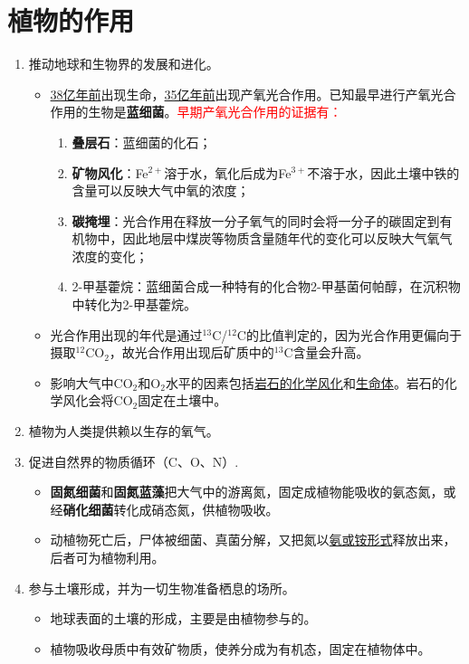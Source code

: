 \section{植物的作用}
\begin{enumerate}
    \item 推动地球和生物界的发展和进化。
    \begin{itemize}
        \item \uline{38亿年前}出现生命，\uline{35亿年前}出现产氧光合作用。已知最早进行产氧光合作用的生物是\textbf{蓝细菌}。\textcolor{red}{早期产氧光合作用的证据有：}
        \begin{enumerate}
            \item \textbf{叠层石}：蓝细菌的化石；
            \item \textbf{矿物风化}：Fe$^{2+}$溶于水，氧化后成为Fe$^{3+}$不溶于水，因此土壤中铁的含量可以反映大气中氧的浓度；
            \item \textbf{碳掩埋}：光合作用在释放一分子氧气的同时会将一分子的碳固定到有机物中，因此地层中煤炭等物质含量随年代的变化可以反映大气氧气浓度的变化；
            \item 2-甲基藿烷：蓝细菌合成一种特有的化合物2-甲基菌何帕醇，在沉积物中转化为2-甲基藿烷。
        \end{enumerate}
        \item 光合作用出现的年代是通过$^{13}$C/$^{12}$C的比值判定的，因为光合作用更偏向于摄取$^{12}$CO$_2$，故光合作用出现后矿质中的$^{13}$C含量会升高。
        \item 影响大气中CO$_2$和O$_2$水平的因素包括\uline{岩石的化学风化}和\uline{生命体}。岩石的化学风化会将CO$_2$固定在土壤中。
    \end{itemize}
    \item 植物为人类提供赖以生存的氧气。
    \item 促进自然界的物质循环（C、O、N）.
    \begin{itemize}
        \item \textbf{固氮细菌}和\textbf{固氮蓝藻}把大气中的游离氮，固定成植物能吸收的氨态氮，或经\textbf{硝化细菌}转化成硝态氮，供植物吸收。
        \item 动植物死亡后，尸体被细菌、真菌分解，又把氮以\uline{氨或铵形式}释放出来，后者可为植物利用。
    \end{itemize}
    \item 参与土壤形成，并为一切生物准备栖息的场所。
    \begin{itemize}
        \item 地球表面的土壤的形成，主要是由植物参与的。
        \item 植物吸收母质中有效矿物质，使养分成为有机态，固定在植物体中。

\end{itemize}
\end{enumerate}
